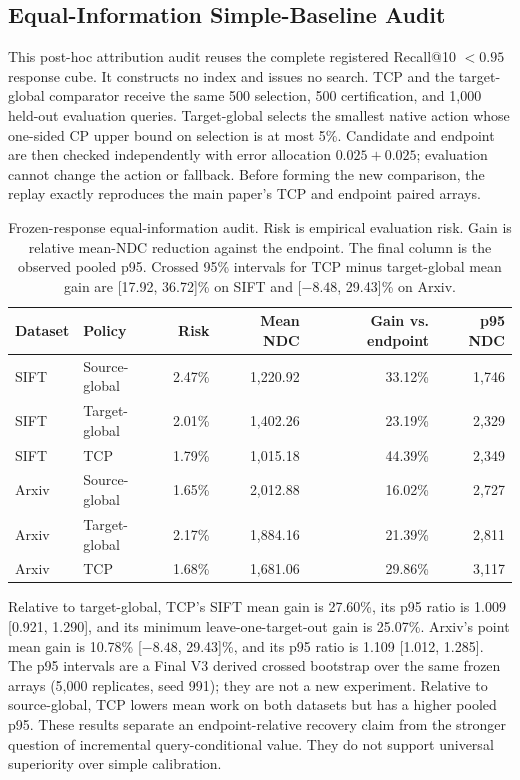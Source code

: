 \documentclass[sigconf,anonymous]{acmart}
\begin{document}
\subsection{Equal-Information Simple-Baseline Audit}
This post-hoc attribution audit reuses the complete registered Recall@10 $<0.95$ response cube. It constructs no index and issues no search. TCP and the target-global comparator receive the same 500 selection, 500 certification, and 1,000 held-out evaluation queries. Target-global selects the smallest native action whose one-sided CP upper bound on selection is at most 5\%. Candidate and endpoint are then checked independently with error allocation $0.025+0.025$; evaluation cannot change the action or fallback. Before forming the new comparison, the replay exactly reproduces the main paper's TCP and endpoint paired arrays.

\begin{table}[t]
\caption{Frozen-response equal-information audit. Risk is empirical evaluation risk. Gain is relative mean-NDC reduction against the endpoint. The final column is the observed pooled p95. Crossed 95\% intervals for TCP minus target-global mean gain are [17.92, 36.72]\% on SIFT and [$-8.48$, 29.43]\% on Arxiv.}
\label{tab:equal-info}
\small\begin{tabular*}{\textwidth}{@{\extracolsep{\fill}}llrrrr@{}}\toprule
Dataset & Policy & Risk & Mean NDC & Gain vs. endpoint & p95 NDC\\\midrule
SIFT & Source-global & 2.47\% & 1,220.92 & 33.12\% & 1,746\\
SIFT & Target-global & 2.01\% & 1,402.26 & 23.19\% & 2,329\\
SIFT & TCP & 1.79\% & 1,015.18 & 44.39\% & 2,349\\
Arxiv & Source-global & 1.65\% & 2,012.88 & 16.02\% & 2,727\\
Arxiv & Target-global & 2.17\% & 1,884.16 & 21.39\% & 2,811\\
Arxiv & TCP & 1.68\% & 1,681.06 & 29.86\% & 3,117\\\bottomrule
\end{tabular*}
\end{table}

Relative to target-global, TCP's SIFT mean gain is 27.60\%, its p95 ratio is 1.009 [0.921, 1.290], and its minimum leave-one-target-out gain is 25.07\%. Arxiv's point mean gain is 10.78\% [$-8.48$, 29.43]\%, and its p95 ratio is 1.109 [1.012, 1.285]. The p95 intervals are a Final V3 derived crossed bootstrap over the same frozen arrays (5,000 replicates, seed 991); they are not a new experiment. Relative to source-global, TCP lowers mean work on both datasets but has a higher pooled p95. These results separate an endpoint-relative recovery claim from the stronger question of incremental query-conditional value. They do not support universal superiority over simple calibration.
\end{document}
